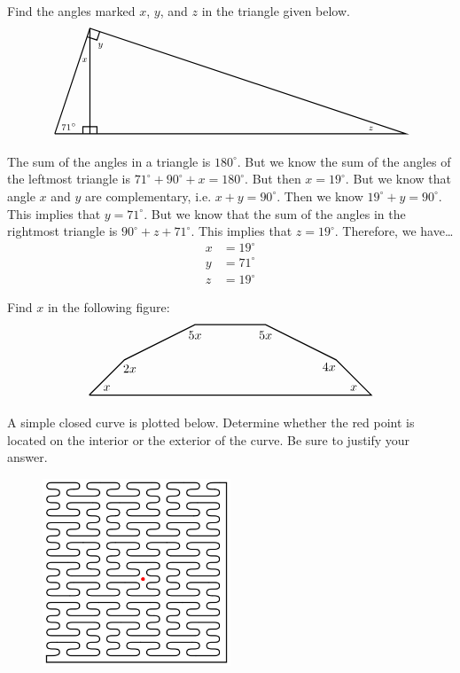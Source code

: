 \documentclass[11pt,letterpaper]{article}
\begin{document}

 Find the angles marked $x$, $y$, and $z$ in the triangle given below. 
	\[
	\begin{tikzpicture}
	\draw[line width=0.03cm] (0,0) -- (1,3) -- (10,0) -- (0,0);
	\draw[line width=0.03cm] (1,3) -- (1,0);
	\draw[line width=0.03cm] (0.8,0) -- (0.8,0.2) -- (1.2,0.2) -- (1.2,0);
	\draw[line width=0.03cm] (0.92,2.76) -- (1.2,2.666) -- (1.2802,2.9066);
	\node at (0.4,0.2) {\scriptsize$71^\circ$};
	\node at (0.85,2.1) {\scriptsize$x$};
	\node at (1.3,2.5) {\scriptsize$y$};
	\node at (9,0.15) {\scriptsize$z$};
	\end{tikzpicture}
	\] \pspace

\sol The sum of the angles in a triangle is $180^\circ$. But we know the sum of the angles of the leftmost triangle is $71^\circ + 90^\circ + x= 180^\circ$. But then $x= 19^\circ$. But we know that angle $x$ and $y$ are complementary, i.e. $x + y= 90^\circ$. Then we know $19^\circ + y= 90^\circ$. This implies that $y= 71^\circ$. But we know that the sum of the angles in the rightmost triangle is $90^\circ + z + 71^\circ$. This implies that $z= 19^\circ$. Therefore, we have\dots
	\[
	\begin{aligned}
	x&= 19^\circ \\[0.3cm]
	y&= 71^\circ \\[0.3cm]
	z&= 19^\circ
	\end{aligned}
	\]



\newpage



 Find $x$ in the following figure:
	\[
	\begin{tikzpicture}
	\draw[line width=0.03cm] (0,0) -- (1,1) -- (3,2) -- (5,2) -- (7,1) -- (8,0) -- (0,0);
	\node at (0.5,0.2) {$x$};
	\node at (1.15,0.75) {$2x$};
	\node at (3,1.7) {$5x$};
	\node at (5,1.7) {$5x$};
	\node at (6.8,0.8) {$4x$};
	\node at (7.5,0.2) {$x$};
	\end{tikzpicture}
	\]



\newpage



 A simple closed curve is plotted below. Determine whether the red point is located on the interior or the exterior of the curve. Be sure to justify your answer.
	\begin{figure}[!ht]
	\centering
	\includegraphics[width=0.5\textwidth]{peanocurve.png}
	\end{figure}
\end{document}
